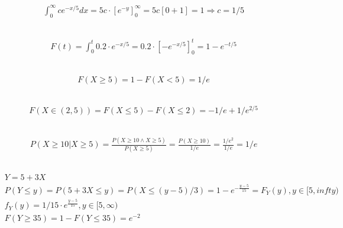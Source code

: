 \documentclass[a4paper]{article}
\begin{document}
\subsection{}
\begin{align*}
\int_0^\infty ce^{-x/5} dx = 5c \cdot [e^{-y}]_0^\infty = 5c [0+1] = 1 \Rightarrow c = 1/5
\end{align*}


\subsection{}
\begin{align*}
F(t) = \int_0^t 0.2 \cdot e^{-x/5}  = 0.2 \cdot [-e^{-x/5}]_0^t = 1 - e^{-t/5}
\end{align*}


\subsection{}
\begin{align*}
F(X \ge 5) = 1 - F(X < 5) = 1/e
\end{align*}


\subsection{}
\begin{align*}
F(X \in (2,5)) = F(X \le 5) - F(X \le 2) = - 1/e + 1/e^{2/5}
\end{align*}


\subsection{}
\begin{align*}
P(X \ge 10 | X \ge 5) = \frac{P(X \ge 10 \wedge X \ge 5)}{P(X \ge 5)} = \frac{P(X \ge 10)}{1/e} = \frac{1/e^2}{1/e} = 1/e 
\end{align*}

\subsection{}
\begin{align*}
& Y = 5 + 3X \\
& P(Y \le y) = P(5 + 3X \le y) = P(X \le (y-5)/3) = 1 - e^{-\frac{y-5}{15}} = F_Y(y), y \in [5, infty) \\
& f_Y(y) = 1/15 \cdot e^ {\frac{y-5}{15}}, y \in [5, \infty) \\
& F(Y \ge 35) = 1 - F(Y \le 35) = e^{-2}
\end{align*}
\end{document}
